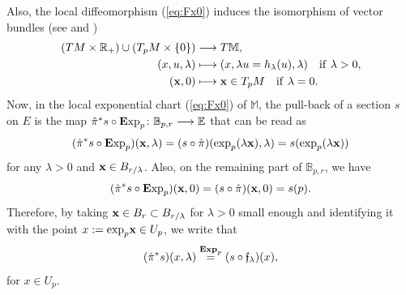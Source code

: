 \documentclass[10pt,a4paper]{amsart}
\numberwithin{equation}{section}
\theoremstyle{definition}
\newcommand{\R}{\mathbb R}
\newcommand{\B}{\mathbb B}
\newcommand{\M}{\mathbb M}
\newcommand{\E}{\mathbb E}
\newcommand{\Exp}{{\mathbf E}{\rm xp}}
\begin{document}
Also, the local diffeomorphism (\ref{eq:Fx0}) induces the isomorphism of vector bundles (see \cite[Remark~3.4\,(e)]{DS2} and \cite[pp.~67--68]{F})
\begin{align*}
	(TM\times\R_+)\cup (T_pM\times \{0\})&\longrightarrow T\M,\\
	 (x, u, \lambda)&\longmapsto (x, \lambda u= h_\lambda(u), \lambda) \quad {\rm if}\ \lambda>0,\\
	 (\mathbf{x},0)&\longmapsto \mathbf{x}\in T_{p}M \quad {\rm if}\ \lambda=0.
\end{align*}
 Now, in the local exponential chart (\ref{eq:Fx0}) of $\M$, the pull-back of a section $s$ on $E$ is the map $\hat\pi^*s\circ\Exp_p\colon \B_{p,r}\longrightarrow \E$ that can be read as
\[(\hat\pi^*s\circ\Exp_p)({\bf x},\lambda)=(s\circ \hat\pi)({\rm exp}_p(\lambda {\bf x}),\lambda)=s({\rm exp}_p(\lambda {\bf x}))\]
for any $\lambda>0$ and ${\bf x}\in B_{r/
\lambda}$. Also, on the remaining part of $\B_{p,r}$, we have
\[(\hat\pi^*s\circ\Exp_p)({\bf x},0)=(s\circ\hat\pi)({\bf x},0)=s(p).\]
Therefore, by taking ${\bf x}\in B_r\subset B_{r/
\lambda}$ for $\lambda>0$ small enough and identifying it with the point $x:={\rm exp}_p{\bf x}\in U_p$, we write that
\begin{equation*}%
(\hat \pi^* s)(x,\lambda)\overset{\text{\bf Exp}_p}{=}(s\circ \mathfrak{f}_\lambda)(x),
 \end{equation*}
for $x\in U_p$.
\end{document}
